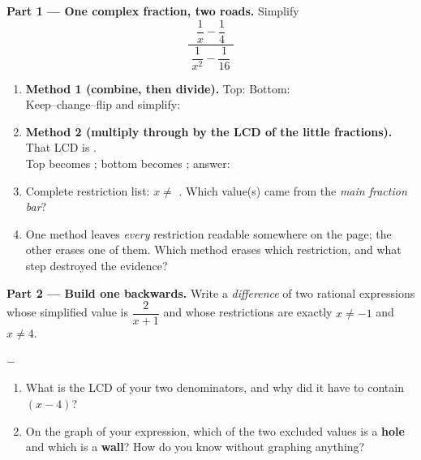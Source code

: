 \documentclass[10pt]{article}
\begin{document}
\begin{tcolorbox}[colback=white, colframe=black!40, title=\textbf{Tier E --- Extension},
    fonttitle=\bfseries, arc=1.5mm, left=3mm, right=3mm, top=2mm, bottom=2mm, breakable]
\textbf{Part 1 --- One complex fraction, two roads.} Simplify
\[
  \frac{\;\dfrac{1}{x}-\dfrac{1}{4}\;}{\;\dfrac{1}{x^2}-\dfrac{1}{16}\;}
\]
\begin{enumerate}[label=(\alph*), leftmargin=1.9em, itemsep=6pt]
  \item \textbf{Method 1 (combine, then divide).} Top: \blank{2.0cm} \quad Bottom: \blank{2.6cm}
        \\[3pt]
        Keep--change--flip and simplify: \blank{2.4cm}
  \item \textbf{Method 2 (multiply through by the LCD of the little fractions).} That LCD is
        \blank{1.4cm}. \\[3pt]
        Top becomes \blank{2.2cm}; bottom becomes \blank{2.2cm}; answer: \blank{2.0cm}
  \item Complete restriction list: $x\neq$ \blank{2.4cm}. Which value(s) came from the \emph{main
        fraction bar}? \blank{2.0cm}
  \item One method leaves \emph{every} restriction readable somewhere on the page; the other erases
        one of them. Which method erases which restriction, and what step destroyed the evidence?
\end{enumerate}

\vspace{5pt}
\textbf{Part 2 --- Build one backwards.} Write a \emph{difference} of two rational expressions whose
simplified value is $\dfrac{2}{x+1}$ and whose restrictions are exactly $x\neq-1$ and $x\neq4$.
\begin{center}
\blank{3.6cm} $-$ \blank{3.6cm}
\end{center}
\begin{enumerate}[label=(\alph*), leftmargin=1.9em, itemsep=5pt]
  \item What is the LCD of your two denominators, and why did it have to contain $(x-4)$?
  \item On the graph of your expression, which of the two excluded values is a \textbf{hole} and which
        is a \textbf{wall}? How do you know without graphing anything?
\end{enumerate}


\end{tcolorbox}
\end{document}
